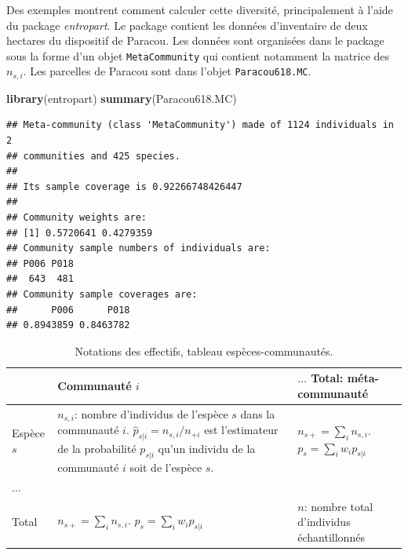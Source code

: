 \documentclass[
  11pt,
  french,
  a4paper,
  extrafontsizes,onecolumn,openright
  ]{memoir}
\newenvironment{Shaded}{\begin{snugshade}}{\end{snugshade}}
\newcommand{\KeywordTok}[1]{\textcolor[rgb]{0.13,0.29,0.53}{\textbf{#1}}}
\newcommand{\NormalTok}[1]{#1}
\begin{document}
Des exemples montrent comment calculer cette diversité, principalement à l'aide du package \emph{entropart}.
Le package contient les données d'inventaire de deux hectares du dispositif de Paracou.
Les données sont organisées dans le package sous la forme d'un objet \texttt{MetaCommunity} qui contient notamment la matrice des \(n_{s,i}\).
Les parcelles de Paracou sont dans l'objet \texttt{Paracou618.MC}.

\scriptsize

\begin{Shaded}
\begin{Highlighting}[]
\KeywordTok{library}\NormalTok{(entropart)}
\KeywordTok{summary}\NormalTok{(Paracou618.MC)}
\end{Highlighting}
\end{Shaded}

\begin{verbatim}
## Meta-community (class 'MetaCommunity') made of 1124 individuals in 2 
## communities and 425 species. 
## 
## Its sample coverage is 0.92266748426447 
## 
## Community weights are: 
## [1] 0.5720641 0.4279359
## Community sample numbers of individuals are: 
## P006 P018 
##  643  481 
## Community sample coverages are: 
##      P006      P018 
## 0.8943859 0.8463782
\end{verbatim}

\normalsize



\scriptsize

\begin{table}

\caption{\label{tab:Notations}Notations des effectifs, tableau espèces-communautés.}
\centering
\fontsize{9}{11}\selectfont
\begin{tabu} to 
\toprule
 & Communauté $i$ & $\dots$ Total: méta-communauté\\
\midrule
Espèce $s$ & $n_{s,i}$: nombre d'individus de l'espèce $s$ dans la communauté $i$. $\hat{p}_{s|i}=n_{s,i}/n_{+i}$ est l'estimateur de la probabilité $p_{s|i}$ qu'un individu de la communauté $i$ soit de l'espèce $s$. & $n_{s+}=\sum_i{n_{s,i}}$. $p_s=\sum_i{w_{i}p_{s|i}}$\\
$\dots$ &  & \\
Total & $n_{s+}=\sum_i{n_{s,i}}$. $p_s=\sum_i{w_{i}p_{s|i}}$ & $n$: nombre total d'individus échantillonnés\\
\bottomrule
\end{tabu}
\end{table}
\end{document}
